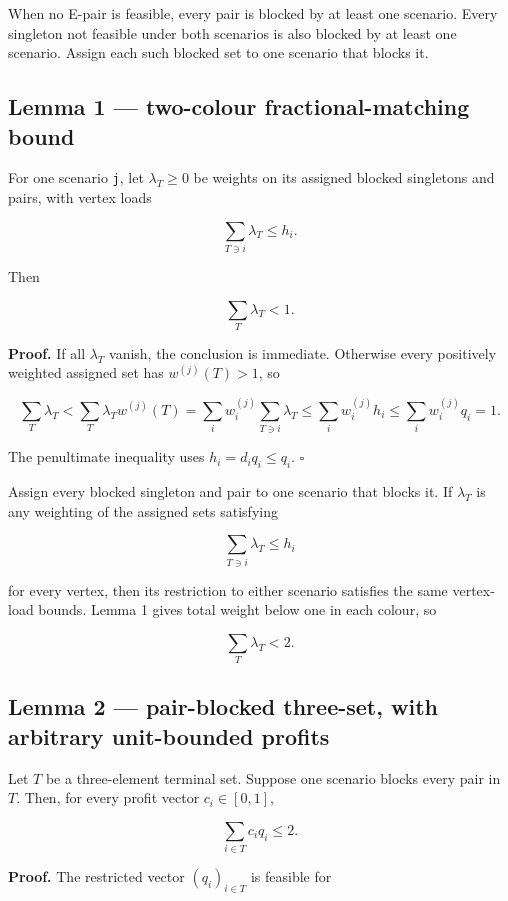 \documentclass[
  11pt,
]{article}
\begin{document}
When no E-pair is feasible, every pair is blocked by at least one
scenario. Every singleton not feasible under both scenarios is also
blocked by at least one scenario. Assign each such blocked set to one
scenario that blocks it.

\subsection{Lemma 1 --- two-colour fractional-matching
bound}\label{lemma-1-two-colour-fractional-matching-bound}

For one scenario \texttt{j}, let \(\lambda_T\ge0\) be weights on its
assigned blocked singletons and pairs, with vertex loads

\[
\sum_{T\ni i}\lambda_T\le h_i.
\]

Then

\[
\sum_T\lambda_T<1.
\]

\textbf{Proof.} If all \(\lambda_T\) vanish, the conclusion is
immediate. Otherwise every positively weighted assigned set has
\(w^{(j)}(T)>1\), so

\[
\sum_T\lambda_T
<
\sum_T\lambda_Tw^{(j)}(T)
=
\sum_iw_i^{(j)}\sum_{T\ni i}\lambda_T
\le
\sum_iw_i^{(j)}h_i
\le
\sum_iw_i^{(j)}q_i
=1.
\]

The penultimate inequality uses \(h_i=d_iq_i\le q_i\). \(\square\)

Assign every blocked singleton and pair to one scenario that blocks it.
If \(\lambda_T\) is any weighting of the assigned sets satisfying

\[
\sum_{T\ni i}\lambda_T\le h_i
\]

for every vertex, then its restriction to either scenario satisfies the
same vertex-load bounds. Lemma 1 gives total weight below one in each
colour, so

\[
\sum_T\lambda_T<2.
\]

\subsection{Lemma 2 --- pair-blocked three-set, with arbitrary
unit-bounded
profits}\label{lemma-2-pair-blocked-three-set-with-arbitrary-unit-bounded-profits}

Let \(T\) be a three-element terminal set. Suppose one scenario blocks
every pair in \(T\). Then, for every profit vector \(c_i\in[0,1]\),

\[
\sum_{i\in T}c_iq_i\le2.
\tag{14}
\]

\textbf{Proof.} The restricted vector \((q_i)_{i\in T}\) is feasible for
\end{document}
